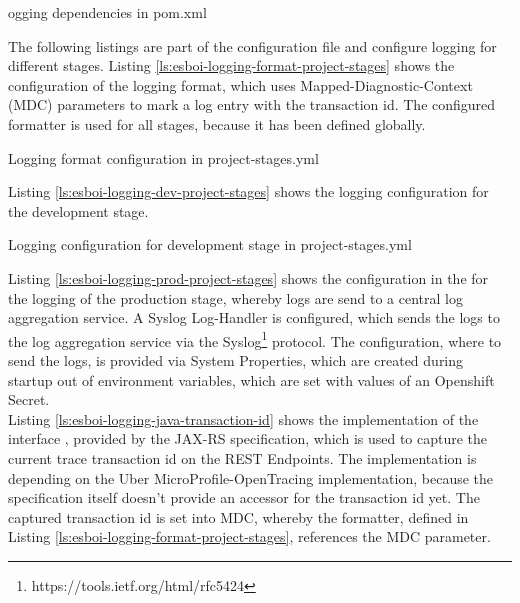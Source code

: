 \begin{listing}[h]
	\caption{ogging dependencies in pom.xml}
	\label{ls:esboi-logging-pom}
\end{listing}

The following listings are part of the  configuration file and configure logging for different stages. Listing \vref{ls:esboi-logging-format-project-stages} shows the configuration of the logging format, which uses Mapped-Diagnostic-Context (MDC) parameters to mark a log entry with the transaction id. The configured formatter is used for all stages, because it has been defined globally.

\begin{listing}[h]
	\caption{Logging format configuration in project-stages.yml}
	\label{ls:esboi-logging-format-project-stages}
\end{listing}

Listing \vref{ls:esboi-logging-dev-project-stages} shows the logging configuration for the development stage.

\begin{listing}[h]
	\caption{Logging configuration for development stage in project-stages.yml}
	\label{ls:esboi-logging-dev-project-stages}
\end{listing}

Listing \vref{ls:esboi-logging-prod-project-stages} shows the configuration in the  for the logging of the production stage, whereby logs are send to a central log aggregation service. A Syslog Log-Handler is configured, which sends the logs to the log aggregation service via the Syslog\footnote{https://tools.ietf.org/html/rfc5424} protocol. The configuration, where to send the logs, is provided via System Properties, which are created during startup out of environment variables, which are set with values of an Openshift Secret. \\

Listing \vref{ls:esboi-logging-java-transaction-id} shows the implementation of the interface , provided by the JAX-RS specification, which is used to capture the current trace transaction id on the REST Endpoints. The implementation is depending on the Uber MicroProfile-OpenTracing implementation, because the specification itself doesn't provide an accessor for the transaction id yet. The captured transaction id is set into MDC, whereby the formatter, defined in Listing \vref{ls:esboi-logging-format-project-stages}, references the MDC parameter.
\newpage

